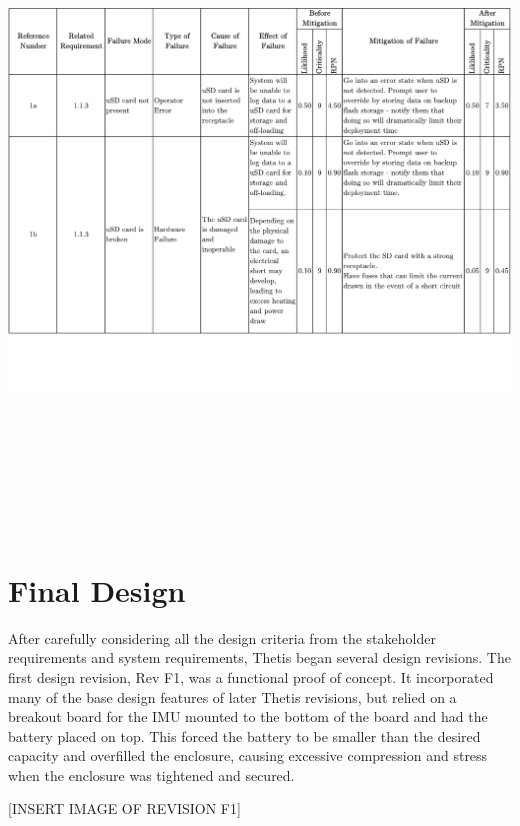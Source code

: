\begin{landscape}
		\newpage
		\includegraphics[height=6.75in, page=6]{../include/ThetisFMECA.pdf}
	\endgroup
\end{landscape}

\section{Final Design} \label{sec:final_design}
After carefully considering all the design criteria from the stakeholder requirements and system requirements, Thetis began several design revisions.
The first design revision, Rev F1, was a functional proof of concept.
It incorporated many of the base design features of later Thetis revisions, but relied on a breakout board for the IMU mounted to the bottom of the board and had the battery placed on top.
This forced the battery to be smaller than the desired capacity and overfilled the enclosure, causing excessive compression and stress when the enclosure was tightened and secured.

[INSERT IMAGE OF REVISION F1]

